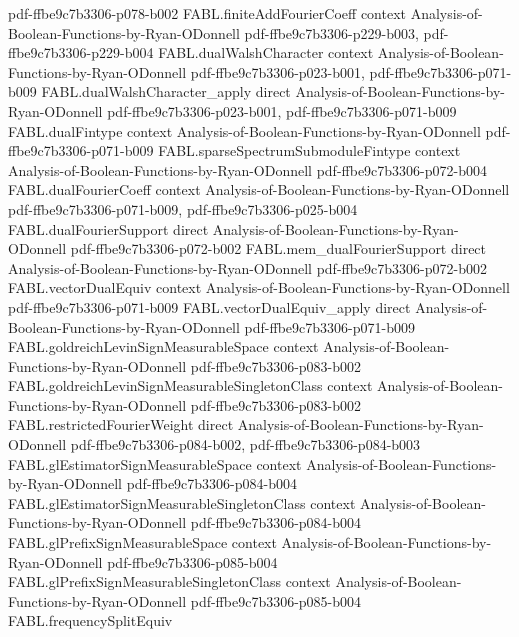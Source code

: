 \begin{theorem}
  {pdf-ffbe9c7b3306-p078-b002}
\proofstep
  {FABL.finiteAddFourierCoeff}
  {context}
  {Analysis-of-Boolean-Functions-by-Ryan-ODonnell}
  {pdf-ffbe9c7b3306-p229-b003,
    pdf-ffbe9c7b3306-p229-b004}
\proofstep
  {FABL.dualWalshCharacter}
  {context}
  {Analysis-of-Boolean-Functions-by-Ryan-ODonnell}
  {pdf-ffbe9c7b3306-p023-b001,
    pdf-ffbe9c7b3306-p071-b009}
\proofstep
  {FABL.dualWalshCharacter_apply}
  {direct}
  {Analysis-of-Boolean-Functions-by-Ryan-ODonnell}
  {pdf-ffbe9c7b3306-p023-b001,
    pdf-ffbe9c7b3306-p071-b009}
\proofstep
  {FABL.dualFintype}
  {context}
  {Analysis-of-Boolean-Functions-by-Ryan-ODonnell}
  {pdf-ffbe9c7b3306-p071-b009}
\proofstep
  {FABL.sparseSpectrumSubmoduleFintype}
  {context}
  {Analysis-of-Boolean-Functions-by-Ryan-ODonnell}
  {pdf-ffbe9c7b3306-p072-b004}
\proofstep
  {FABL.dualFourierCoeff}
  {context}
  {Analysis-of-Boolean-Functions-by-Ryan-ODonnell}
  {pdf-ffbe9c7b3306-p071-b009,
    pdf-ffbe9c7b3306-p025-b004}
\proofstep
  {FABL.dualFourierSupport}
  {direct}
  {Analysis-of-Boolean-Functions-by-Ryan-ODonnell}
  {pdf-ffbe9c7b3306-p072-b002}
\proofstep
  {FABL.mem_dualFourierSupport}
  {direct}
  {Analysis-of-Boolean-Functions-by-Ryan-ODonnell}
  {pdf-ffbe9c7b3306-p072-b002}
\proofstep
  {FABL.vectorDualEquiv}
  {context}
  {Analysis-of-Boolean-Functions-by-Ryan-ODonnell}
  {pdf-ffbe9c7b3306-p071-b009}
\proofstep
  {FABL.vectorDualEquiv_apply}
  {direct}
  {Analysis-of-Boolean-Functions-by-Ryan-ODonnell}
  {pdf-ffbe9c7b3306-p071-b009}
\proofstep
  {FABL.goldreichLevinSignMeasurableSpace}
  {context}
  {Analysis-of-Boolean-Functions-by-Ryan-ODonnell}
  {pdf-ffbe9c7b3306-p083-b002}
\proofstep
  {FABL.goldreichLevinSignMeasurableSingletonClass}
  {context}
  {Analysis-of-Boolean-Functions-by-Ryan-ODonnell}
  {pdf-ffbe9c7b3306-p083-b002}
\proofstep
  {FABL.restrictedFourierWeight}
  {direct}
  {Analysis-of-Boolean-Functions-by-Ryan-ODonnell}
  {pdf-ffbe9c7b3306-p084-b002,
    pdf-ffbe9c7b3306-p084-b003}
\proofstep
  {FABL.glEstimatorSignMeasurableSpace}
  {context}
  {Analysis-of-Boolean-Functions-by-Ryan-ODonnell}
  {pdf-ffbe9c7b3306-p084-b004}
\proofstep
  {FABL.glEstimatorSignMeasurableSingletonClass}
  {context}
  {Analysis-of-Boolean-Functions-by-Ryan-ODonnell}
  {pdf-ffbe9c7b3306-p084-b004}
\proofstep
  {FABL.glPrefixSignMeasurableSpace}
  {context}
  {Analysis-of-Boolean-Functions-by-Ryan-ODonnell}
  {pdf-ffbe9c7b3306-p085-b004}
\proofstep
  {FABL.glPrefixSignMeasurableSingletonClass}
  {context}
  {Analysis-of-Boolean-Functions-by-Ryan-ODonnell}
  {pdf-ffbe9c7b3306-p085-b004}
\proofstep
  {FABL.frequencySplitEquiv}

\end{theorem}
